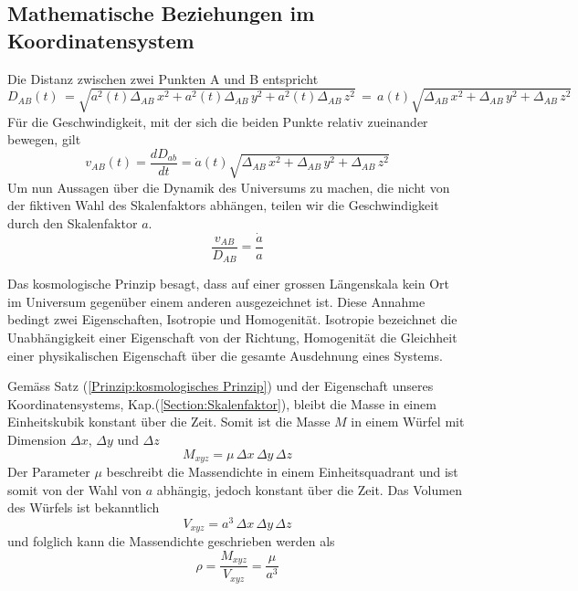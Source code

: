 \begin{refsection}
\subsection{Mathematische Beziehungen im Koordinatensystem \label{friedmann:Beziehungen im Koordinatensystem}}
Die Distanz zwischen zwei Punkten A und B entspricht 
\begin{equation}
D_{AB}(t)\, = \sqrt{a^2(t)\Delta_{AB}\,x^2 + a^2(t)\Delta_{AB}\,y^2 + a^2(t)\Delta_{AB}\,z^2}\, =\, a(t) \sqrt{\Delta_{AB}\,x^2 + \Delta_{AB}\,y^2 + \Delta_{AB}\,z^2}
\label{friedmann:Abstand}
\end{equation}
F\"{u}r die Geschwindigkeit, mit der sich die beiden Punkte relativ zueinander bewegen, gilt 
\begin{equation}
v_{AB}(t) = \dfrac{dD_{ab}}{dt} 
= \dot{a}(t) \sqrt{\Delta_{AB}\,x^2 + \Delta_{AB}\,y^2 + \Delta_{AB}\,z^2}
\label{friedmann:geschwindigkeit}
\end{equation}
Um nun Aussagen über die Dynamik des Universums zu machen, die nicht von der fiktiven Wahl des Skalenfaktors abhängen, teilen wir die Geschwindigkeit durch den Skalenfaktor $a$.
\begin{equation}
\frac{v_{AB} }{D_{AB}} = \frac{\dot{a}}{a}
\end{equation}
\begin{satz}
\label{Prinzip:kosmologisches Prinzip}
Das kosmologische Prinzip besagt, dass auf einer grossen Längenskala kein Ort im Universum gegenüber einem anderen ausgezeichnet ist. Diese Annahme bedingt zwei Eigenschaften, Isotropie und Homogenität. Isotropie  bezeichnet die Unabhängigkeit einer Eigenschaft von der Richtung, Homogenität die Gleichheit einer physikalischen Eigenschaft über die gesamte Ausdehnung eines Systems.
\end{satz}
Gemäss Satz (\ref{Prinzip:kosmologisches Prinzip}) und der Eigenschaft unseres Koordinatensystems, Kap.(\ref{Section:Skalenfaktor}), bleibt die Masse in einem Einheitskubik konstant über die Zeit. Somit ist die Masse $M$ in einem Würfel mit Dimension $\Delta x$, $\Delta y$ und $\Delta z$ 
\begin{equation}
M_{xyz} = \mu \,\Delta x \,\Delta y \,\Delta z
\end{equation}
Der Parameter $\mu$ beschreibt die Massendichte in einem Einheitsquadrant und ist somit von der Wahl von $a$ abhängig, jedoch konstant über die Zeit. Das Volumen des Würfels ist bekanntlich
\begin{equation}
V_{xyz} = a^3 \,\Delta x \,\Delta y \,\Delta z
\end{equation}
und folglich kann die Massendichte geschrieben werden als
\begin{equation}
\rho = \frac{M_{xyz}}{V_{xyz}} = \frac{\mu}{a^3}
\label{friedmann:dichte}
\end{equation}


\end{refsection}
